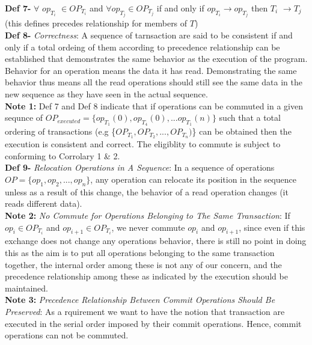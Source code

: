 \documentclass[a4paper, 11pt]{article}
\begin{document}
\textbf{Def 7-} $\forall$ $op_{T_i}$ $\in OP_{T_i}$ and $\forall op_{T_j}\in OP_{T_j}$ if and only if $op_{T_i} \rightarrow op_{T_j}$ then $T_i$ $\rightarrow T_j$ \hspace{8mm} (this defines precedes relationship for members of $T$) \\

\textbf{Def 8-} \emph{Correctness}: A sequence of tarnsaction are said to be consistent if and only if a total ordeing of them according to precedence relationship can be established that demonstrates the same behavior as the execution of the program. Behavior for an operation means the data it has read. Demonstrating the same behavior thus means all the read operations should still see the same data in the new sequence as they have seen in the actual sequence.\\

\textbf{Note 1:} Def 7 and Def 8 indicate that if operations can be commuted in a given sequnce of $OP_{executed} = \{op_{T_1}(0), op_{T_4}(0), ... op_{T_1}(n)\}$ such that a total ordering of transactions (e.g \{$OP_{T_1}, OP_{T_2}, ..., OP_{T_n}) $\} can be obtained then the execution is consistent and correct. The eligiblity to commute is subject to conforming to Corrolary 1 \& 2.\\

\textbf{Def 9-} \emph{Relocation Operations in A Sequence}: In a sequence of operations $OP = \{op_1, op_2, ...,op_n\}$, any operation can relocate its position in the sequence unless as a result of this change, the behavior of a read operation changes (it reads different data).\\

\textbf{Note 2:} \emph{No Commute for Operations Belonging to The Same Transaction}: If $op_i \in OP_{T_i}$ and $op_{i+1} \in OP_{T_i}$, we never commute $op_i$ and $op_{i+1}$, since even if this exchange does not change any operations behavior, there is still no point in doing this as the aim is to put all operations belonging to the same transaction together, the internal order among these is not any of our concern, and the precedence relationship among these as indicated by the execution should be maintained.\\ 

\textbf{Note 3:} \emph{Precedence Relationship Between Commit Operations Should Be Preserved}: As a rquirement we want to have the notion that transaction are executed in the serial order imposed by their commit operations. Hence, commit operations can not be commuted.\\
\end{document}
